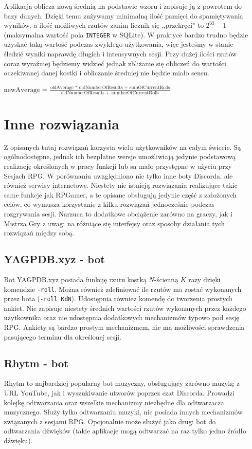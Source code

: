 \documentclass[shortabstract,inz]{iithesis}
\begin{document}
			Aplikacja oblicza nową średnią na podstawie wzoru i zapisuje ją z powrotem do bazy danych. Dzięki temu zużywamy minimalną ilość pamięci do spamiętywania wyników, a ilość możliwych rzutów zanim licznik się ,,przekręci'' to \(2^{63} - 1\) (maksymalna wartość pola \texttt{INTEGER} w SQLite). W praktyce bardzo trudno będzie uzyskać taką wartość podczas zwykłego użytkowania, więc jesteśmy w stanie śledzić wyniki naprawdę długich i intensywnych sesji. Przy dużej ilości rzutów coraz wyraźniej będziemy widzieć jednak zbliżanie się obliczeń do wartości oczekiwanej danej kostki i obliczanie średniej nie będzie miało sensu.
			
			\begin{center}
				\(\textrm{newAverage = } \frac{\textrm{oldAverage * oldNumberOfResults + sumOfCurrentRolls}}{\textrm{oldNumberOfResults + numberOfCurrentRolls}}\)
			\end{center}		
		
	\chapter{Inne rozwiązania}	
		Z opisanych tutaj rozwiązań korzysta wielu użytkowników na całym świecie. Są ogólnodostępne, jednak ich bezpłatne wersje umożliwiają jedynie podstawową realizację określonych w pracy funkcji lub są mało przystępne w użyciu przy Sesjach RPG. W porównaniu uwzględniono nie tylko inne boty Discorda, ale również serwisy internetowe. Niestety nie istnieją rozwiązania realizujące takie same funkcje jak RPGamer, a te opisane obsługują jedynie część z założonych celów, co wymusza korzystanie z kilku rozwiązań jednocześnie podczas rozgrywania sesji. Narzuca to dodatkowe obciążenie zarówno na graczy, jak i Mistrza Gry z uwagi na różniące się interfejsy oraz sposoby działania tych rozwiązań między sobą.
		\section{YAGPDB.xyz - bot}
		Bot YAGPDB.xyz\cite{yagpdb} posiada funkcję rzutu kostką \(N\)-ścienną \(K\) razy dzięki komendzie \texttt{-roll}. Można również zdefiniować ile rzutów ma zostać wykonanych przez bota (\texttt{-roll KdN}). Udostępnia również komendę do tworzenia prostych ankiet. Nie zapisuje niestety średnich wartości rzutów wykonanych przez każdego użytkownika oraz nie udostępnia dodatkowych mechanizmów typowo pod sesję RPG. Ankiety są bardzo prostym mechanizmem, nie ma możliwości sprawdzenia pasującego terminu dla określonej sesji.
		\section{Rhytm - bot}
		Rhytm\cite{rhytm} to najbardziej popularny bot muzyczny, obsługujący zarówno muzykę z URL YouTube, jak i wyszukiwanie utworów poprzez czat Discorda. Prowadzi kolejkę odtwarzania oraz wszelkie mechanizmy niezbędne dla odtwarzacza muzycznego. Służy tylko odtwarzaniu muzyki, nie posiada innych mechanizmów związanych z sesjami RPG. Opcjonalnie może służyć jako drugi bot do odtwarzania dźwięków (takie aplikacje mogą odtwarzać na raz tylko jedno źródło dźwięku).
\end{document}
